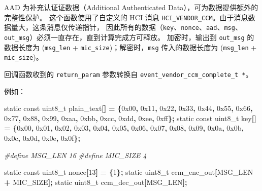 \documentclass[
  12pt,
]{book}
\newenvironment{Shaded}{\begin{snugshade}}{\end{snugshade}}
\newcommand{\BaseNTok}[1]{\textcolor[rgb]{0.00,0.00,0.81}{#1}}
\newcommand{\DataTypeTok}[1]{\textcolor[rgb]{0.13,0.29,0.53}{#1}}
\newcommand{\DecValTok}[1]{\textcolor[rgb]{0.00,0.00,0.81}{#1}}
\newcommand{\NormalTok}[1]{#1}
\newcommand{\OperatorTok}[1]{\textcolor[rgb]{0.81,0.36,0.00}{\textbf{#1}}}
\newcommand{\PreprocessorTok}[1]{\textcolor[rgb]{0.56,0.35,0.01}{\textit{#1}}}
\begin{document}
AAD 为补充认证证数据（Additional Authenticated Data），可为数据提供额外的完整性保护。
这个函数使用了自定义的 HCI 消息 \texttt{HCI\_VENDOR\_CCM}。由于消息数据量大，这条消息仅传递指针，
因此所有的数据（\texttt{key}、\texttt{nonce}、\texttt{aad}、\texttt{msg}、\texttt{out\_msg}）必须一直存在，直到计算完成方可释放。
加密时，输出到 \texttt{out\_msg} 的数据长度为 (\texttt{msg\_len} + \texttt{mic\_size})；解密时，\texttt{msg} 传入的数据长度为
(\texttt{msg\_len} + \texttt{mic\_size})。

回调函数收到的 \texttt{return\_param} 参数转换自 \texttt{event\_vendor\_ccm\_complete\_t\ *}。

例如：

\begin{Shaded}
\begin{Highlighting}[]
\DataTypeTok{static} \DataTypeTok{const} \DataTypeTok{uint8\_t}\NormalTok{ plain\_text}\OperatorTok{[]} \OperatorTok{=}
    \OperatorTok{\{}\BaseNTok{0x00}\OperatorTok{,} \BaseNTok{0x11}\OperatorTok{,} \BaseNTok{0x22}\OperatorTok{,} \BaseNTok{0x33}\OperatorTok{,} \BaseNTok{0x44}\OperatorTok{,} \BaseNTok{0x55}\OperatorTok{,} \BaseNTok{0x66}\OperatorTok{,} \BaseNTok{0x77}\OperatorTok{,}
     \BaseNTok{0x88}\OperatorTok{,} \BaseNTok{0x99}\OperatorTok{,} \BaseNTok{0xaa}\OperatorTok{,} \BaseNTok{0xbb}\OperatorTok{,} \BaseNTok{0xcc}\OperatorTok{,} \BaseNTok{0xdd}\OperatorTok{,} \BaseNTok{0xee}\OperatorTok{,} \BaseNTok{0xff}\OperatorTok{\};}
\DataTypeTok{static} \DataTypeTok{const} \DataTypeTok{uint8\_t}\NormalTok{ key}\OperatorTok{[]} \OperatorTok{=}
    \OperatorTok{\{}\BaseNTok{0x00}\OperatorTok{,} \BaseNTok{0x01}\OperatorTok{,} \BaseNTok{0x02}\OperatorTok{,} \BaseNTok{0x03}\OperatorTok{,} \BaseNTok{0x04}\OperatorTok{,} \BaseNTok{0x05}\OperatorTok{,} \BaseNTok{0x06}\OperatorTok{,} \BaseNTok{0x07}\OperatorTok{,}
     \BaseNTok{0x08}\OperatorTok{,} \BaseNTok{0x09}\OperatorTok{,} \BaseNTok{0x0a}\OperatorTok{,} \BaseNTok{0x0b}\OperatorTok{,} \BaseNTok{0x0c}\OperatorTok{,} \BaseNTok{0x0d}\OperatorTok{,} \BaseNTok{0x0e}\OperatorTok{,} \BaseNTok{0x0f}\OperatorTok{\};}

\PreprocessorTok{\#define MSG\_LEN     16}
\PreprocessorTok{\#define MIC\_SIZE    4}

\DataTypeTok{static} \DataTypeTok{const} \DataTypeTok{uint8\_t}\NormalTok{ nonce}\OperatorTok{[}\DecValTok{13}\OperatorTok{]} \OperatorTok{=} \OperatorTok{\{}\DecValTok{1}\OperatorTok{\};}
\DataTypeTok{static} \DataTypeTok{uint8\_t}\NormalTok{ ccm\_enc\_out}\OperatorTok{[}\NormalTok{MSG\_LEN }\OperatorTok{+}\NormalTok{ MIC\_SIZE}\OperatorTok{];}
\DataTypeTok{static} \DataTypeTok{uint8\_t}\NormalTok{ ccm\_dec\_out}\OperatorTok{[}\NormalTok{MSG\_LEN}\OperatorTok{];}
\end{Highlighting}
\end{Shaded}
\end{document}
